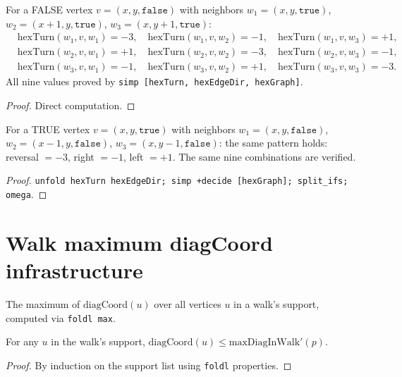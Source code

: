 \begin{lemma}
\begin{lemma}\label{lem:hex_turns_false2}
\leanok
{}
  For a FALSE vertex $v = (x,y,\mathtt{false})$ with neighbors
  $w_1 = (x,y,\mathtt{true})$, $w_2 = (x{+}1,y,\mathtt{true})$,
  $w_3 = (x,y{+}1,\mathtt{true})$:
  \begin{align*}
    &\mathrm{hexTurn}(w_1, v, w_1) = -3, \quad
    \mathrm{hexTurn}(w_1, v, w_2) = -1, \quad
    \mathrm{hexTurn}(w_1, v, w_3) = +1, \\
    &\mathrm{hexTurn}(w_2, v, w_1) = +1, \quad
    \mathrm{hexTurn}(w_2, v, w_2) = -3, \quad
    \mathrm{hexTurn}(w_2, v, w_3) = -1, \\
    &\mathrm{hexTurn}(w_3, v, w_1) = -1, \quad
    \mathrm{hexTurn}(w_3, v, w_2) = +1, \quad
    \mathrm{hexTurn}(w_3, v, w_3) = -3.
  \end{align*}
  All nine values proved by \texttt{simp [hexTurn, hexEdgeDir, hexGraph]}.
\end{lemma}
\begin{proof}\leanok Direct computation.\end{proof}

\begin{lemma}\label{lem:hex_turns_true2}
\leanok
{}
  For a TRUE vertex $v = (x,y,\mathtt{true})$ with neighbors
  $w_1 = (x,y,\mathtt{false})$, $w_2 = (x{-}1,y,\mathtt{false})$,
  $w_3 = (x,y{-}1,\mathtt{false})$:
  the same pattern holds: reversal $= -3$, right $= -1$, left $= +1$.
  The same nine combinations are verified.
\end{lemma}
\begin{proof}\leanok
  \texttt{unfold hexTurn hexEdgeDir; simp +decide [hexGraph]; split\_ifs; omega}.
\end{proof}

\section{Walk maximum diagCoord infrastructure}\label{sec:max_diag}

\begin{definition}\label{def:max_diag_walk}
\leanok
  The maximum of $\mathrm{diagCoord}(u)$ over all vertices $u$ in
  a walk's support, computed via \texttt{foldl max}.
\end{definition}

\begin{lemma}\label{lem:max_diag_ge}
\leanok
{}
  For any $u$ in the walk's support, $\mathrm{diagCoord}(u) \leq
  \mathrm{maxDiagInWalk'}(p)$.
\end{lemma}
\begin{proof}\leanok
  By induction on the support list using \texttt{foldl} properties.
\end{proof}


\end{lemma}
